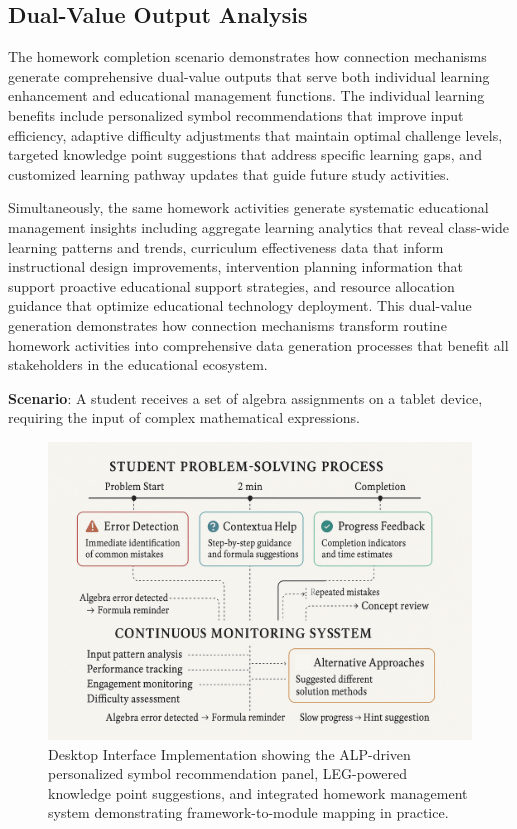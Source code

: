 \documentclass[conference]{IEEEtran}
\begin{document}
\begin{IEEEkeywords}
\subsection{Dual-Value Output Analysis}

The homework completion scenario demonstrates how connection mechanisms generate comprehensive dual-value outputs that serve both individual learning enhancement and educational management functions. The individual learning benefits include personalized symbol recommendations that improve input efficiency, adaptive difficulty adjustments that maintain optimal challenge levels, targeted knowledge point suggestions that address specific learning gaps, and customized learning pathway updates that guide future study activities.

Simultaneously, the same homework activities generate systematic educational management insights including aggregate learning analytics that reveal class-wide learning patterns and trends, curriculum effectiveness data that inform instructional design improvements, intervention planning information that support proactive educational support strategies, and resource allocation guidance that optimize educational technology deployment. This dual-value generation demonstrates how connection mechanisms transform routine homework activities into comprehensive data generation processes that benefit all stakeholders in the educational ecosystem.



\textbf{Scenario}: A student receives a set of algebra assignments on a tablet device, requiring the input of complex mathematical expressions.

\begin{figure}[htbp]
\centerline{\includegraphics[width=\columnwidth]{5.png}}
\caption{Desktop Interface Implementation showing the ALP-driven personalized symbol recommendation panel, LEG-powered knowledge point suggestions, and integrated homework management system demonstrating framework-to-module mapping in practice.}
\label{fig:desktop_interface}
\end{figure}


\end{IEEEkeywords}
\end{document}
